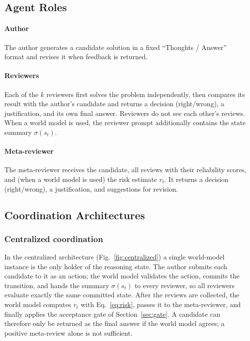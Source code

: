 \subsection{Agent Roles}

\paragraph{Author} The author generates a candidate solution in a fixed ``Thoughts / Answer'' format and revises it when feedback is returned.

\paragraph{Reviewers} Each of the \(k\) reviewers first solves the problem independently, then compares its result with the author's candidate and returns a decision (right/wrong), a justification, and its own final answer. Reviewers do not see each other's reviews. When a world model is used, the reviewer prompt additionally contains the state summary \(\sigma(s_t)\).

\paragraph{Meta-reviewer} The meta-reviewer receives the candidate, all reviews with their reliability scores, and (when a world model is used) the risk estimate \(r_t\). It returns a decision (right/wrong), a justification, and suggestions for revision.

\subsection{Coordination Architectures}

\subsubsection{Centralized coordination}
In the centralized architecture (Fig.~\ref{fig:centralized}) a single world-model instance is the only holder of the reasoning state.
The author submits each candidate to it as an action; the world model validates the action, commits the transition, and hands the summary \(\sigma(s_t)\) to every reviewer, so all reviewers evaluate exactly the same committed state.
After the reviews are collected, the world model computes \(r_t\) with Eq.~\eqref{eq:risk}, passes it to the meta-reviewer, and finally applies the acceptance gate of Section~\ref{sec:gate}.
A candidate can therefore only be returned as the final answer if the world model agrees; a positive meta-review alone is not sufficient.

